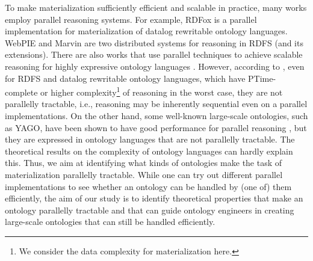 \documentclass{article}
\begin{document}
To make materialization sufficiently efficient and scalable in practice, many works employ parallel reasoning systems. For example, RDFox \cite{DBLP:conf/aaai/MotikNPHO14} is a parallel implementation for materialization of datalog rewritable ontology languages. WebPIE \cite{DBLP:journals/ws/UrbaniKMHB12} and Marvin \cite{oren2009marvin} are two distributed systems for reasoning in RDFS (and its extensions). There are also works that use parallel techniques to achieve scalable reasoning for highly expressive ontology languages \cite{DBLP:conf/dlog/SchlichtS08,DBLP:conf/dlog/WuH12}. However, according to \citeauthor{RAYMOND-GREENLAW} , even for RDFS and datalog rewritable ontology languages, which have PTime-complete or higher complexity\footnote{We consider the data complexity for materialization here.} of reasoning in the worst case, they are not parallelly tractable, i.e., reasoning may be inherently sequential even on a parallel implementations. On the other hand, some well-known large-scale ontologies, such as YAGO, have been shown to have good performance for parallel reasoning \cite{DBLP:conf/icde/SundaraAKDWCS10}, but they are expressed in ontology languages that are not parallelly tractable. The theoretical results on the complexity of ontology languages can hardly explain this. Thus, %
we aim at identifying what kinds of ontologies make the task of materialization parallelly tractable. While one can try out different parallel implementations to see whether an ontology can be handled by (one of) them efficiently, the aim of our study is to identify theoretical properties that make an ontology parallelly tractable and that can guide ontology engineers in creating large-scale ontologies that can still be handled efficiently. 
\end{document}
